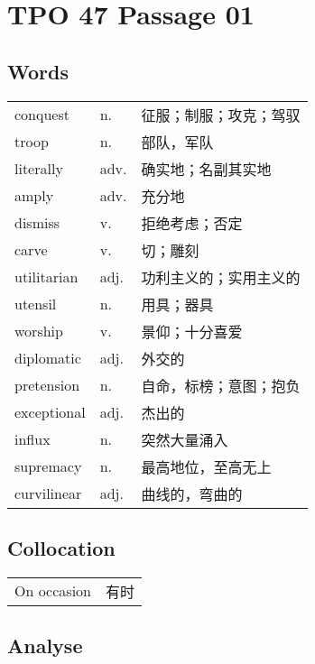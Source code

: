 \section{TPO 47 Passage 01}

\subsection{Words}

\begin{tabular}{lll}
    conquest    & n.   & 征服；制服；攻克；驾驭 \\
    troop       & n.   & 部队，军队       \\
    literally   & adv. & 确实地；名副其实地   \\
    amply       & adv. & 充分地         \\
    dismiss     & v.   & 拒绝考虑；否定     \\
    carve       & v.   & 切；雕刻        \\
    utilitarian & adj. & 功利主义的；实用主义的 \\
    utensil     & n.   & 用具；器具       \\
    worship     & v.   & 景仰；十分喜爱     \\
    diplomatic  & adj. & 外交的         \\
    pretension  & n.   & 自命，标榜；意图；抱负 \\
    exceptional & adj. & 杰出的         \\
    influx      & n.   & 突然大量涌入      \\
    supremacy   & n.   & 最高地位，至高无上   \\
    curvilinear & adj. & 曲线的，弯曲的     \\
\end{tabular}

\subsection{Collocation}

\begin{tabular}{ll}
    On occasion & 有时 \\
\end{tabular}


\subsection{Analyse}

